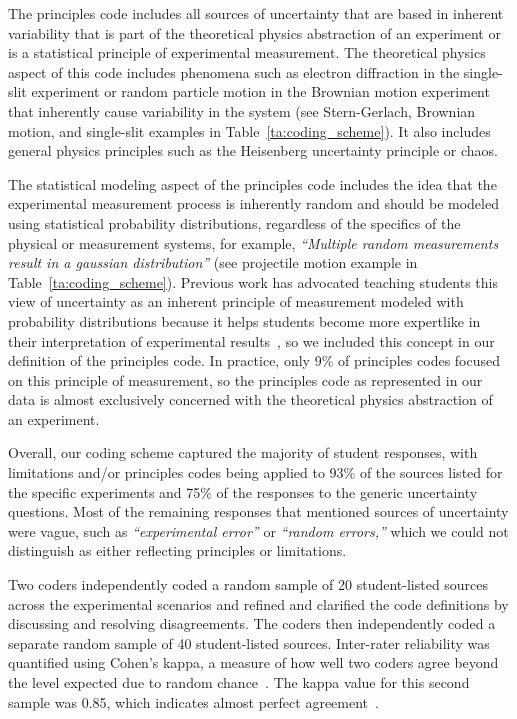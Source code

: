 \documentclass[english,aps,prstper,reprint,showpacs,longbibliography,superscriptaddress,nofootinbib]{revtex4-2}
\begin{document}
The principles code includes all sources of uncertainty that are based in inherent variability that is part of the theoretical physics abstraction of an experiment or is a statistical principle of experimental measurement. The theoretical physics aspect of this code includes phenomena such as electron diffraction in the single-slit experiment or random particle motion in the Brownian motion experiment that inherently cause variability in the system (see Stern-Gerlach, Brownian motion, and single-slit examples in Table~\ref{ta:coding_scheme}). It also includes general physics principles such as the Heisenberg uncertainty principle or chaos. 

The statistical modeling aspect of the principles code includes the idea that the experimental measurement process is inherently random and should be modeled using statistical probability distributions, regardless of the specifics of the physical or measurement systems, for example, \textit{``Multiple random measurements result in a gaussian distribution''} (see projectile motion example in Table~\ref{ta:coding_scheme}). Previous work has advocated teaching students this view of uncertainty as an inherent principle of measurement modeled with probability distributions because it helps students become more expertlike in their interpretation of experimental results~\cite{Evangelinos1999,Evangelinos2002,Allie2003,Pillay2008,Buffler2008}, so we included this concept in our definition of the principles code. In practice, only 9\% of principles codes focused on this principle of measurement, so the principles code as represented in our data is almost exclusively concerned with the theoretical physics abstraction of an experiment.

Overall, our coding scheme captured the majority of student responses, with limitations and/or principles codes being applied to 93\% of the sources listed for the specific experiments and 75\% of the responses to the generic uncertainty questions. Most of the remaining responses that mentioned sources of uncertainty were vague, such as \textit{``experimental error''} or \textit{``random errors,''} which we could not distinguish as either reflecting principles or limitations. 

Two coders independently coded a random sample of 20 student-listed sources across the experimental scenarios and refined and clarified the code definitions by discussing and resolving disagreements. The coders then independently coded a separate random sample of 40 student-listed sources. Inter-rater reliability was quantified using Cohen's kappa, a measure of how well two coders agree beyond the level expected due to random chance~\cite{Cohen1960}. The kappa value for this second sample was 0.85, which indicates almost perfect agreement~\cite{Landis1977}. 
\end{document}
